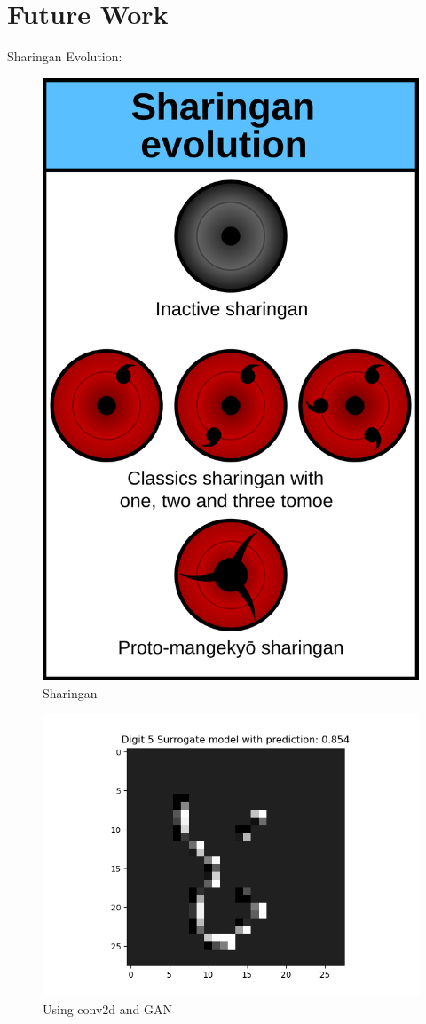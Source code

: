 \documentclass[12pt]{article}
\begin{document}
\section{Future Work}


Sharingan Evolution:\\

\begin{figure}[H]
    \centering
    \includegraphics[width=0.7\linewidth]{../fig/Sharingan-evo.png} %
    \caption{Sharingan}
    \label{fig:sharingan}
\end{figure}
\begin{figure}[H]
    \centering
    \includegraphics[width=0.7\linewidth]{../fig/ID 3-Digit 8 pred 5.png} %
    \caption{Using conv2d and GAN}
    \label{fig:digit5}
\end{figure}
\end{document}
